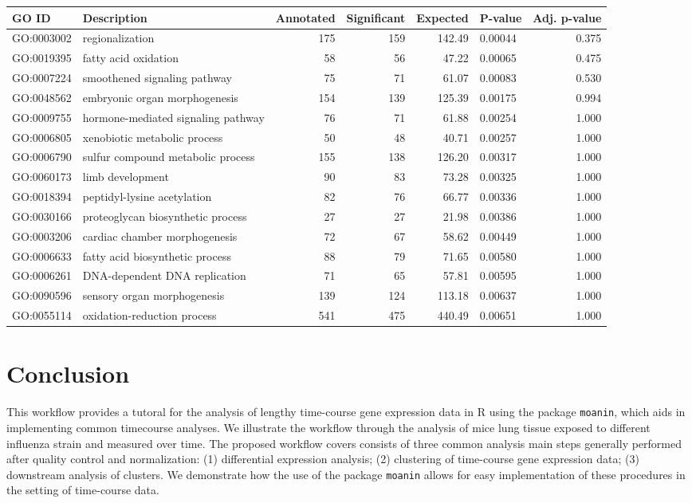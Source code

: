 \documentclass[9pt,a4paper,]{extarticle}
\begin{document}
\begin{tabular}{llrrrlr}
\toprule
GO ID & Description & Annotated & Significant & Expected & P-value & Adj. p-value\\
\midrule
GO:0003002 & regionalization & 175 & 159 & 142.49 & 0.00044 & 0.375\\
GO:0019395 & fatty acid oxidation & 58 & 56 & 47.22 & 0.00065 & 0.475\\
GO:0007224 & smoothened signaling pathway & 75 & 71 & 61.07 & 0.00083 & 0.530\\
GO:0048562 & embryonic organ morphogenesis & 154 & 139 & 125.39 & 0.00175 & 0.994\\
GO:0009755 & hormone-mediated signaling pathway & 76 & 71 & 61.88 & 0.00254 & 1.000\\
\addlinespace
GO:0006805 & xenobiotic metabolic process & 50 & 48 & 40.71 & 0.00257 & 1.000\\
GO:0006790 & sulfur compound metabolic process & 155 & 138 & 126.20 & 0.00317 & 1.000\\
GO:0060173 & limb development & 90 & 83 & 73.28 & 0.00325 & 1.000\\
GO:0018394 & peptidyl-lysine acetylation & 82 & 76 & 66.77 & 0.00336 & 1.000\\
GO:0030166 & proteoglycan biosynthetic process & 27 & 27 & 21.98 & 0.00386 & 1.000\\
\addlinespace
GO:0003206 & cardiac chamber morphogenesis & 72 & 67 & 58.62 & 0.00449 & 1.000\\
GO:0006633 & fatty acid biosynthetic process & 88 & 79 & 71.65 & 0.00580 & 1.000\\
GO:0006261 & DNA-dependent DNA replication & 71 & 65 & 57.81 & 0.00595 & 1.000\\
GO:0090596 & sensory organ morphogenesis & 139 & 124 & 113.18 & 0.00637 & 1.000\\
GO:0055114 & oxidation-reduction process & 541 & 475 & 440.49 & 0.00651 & 1.000\\
\bottomrule
\end{tabular}

\hypertarget{conclusion}{%
\section{Conclusion}\label{conclusion}}

This workflow provides a tutoral for the analysis of lengthy time-course gene
expression data in R using the package \texttt{moanin}, which aids in implementing common timecourse analyses. We illustrate the workflow through the analysis of mice lung tissue
exposed to different influenza strain and measured over time.
The proposed workflow covers consists of three common analysis main steps generally performed after quality
control and normalization: (1) differential expression analysis; (2)
clustering of time-course gene expression data; (3) downstream analysis of
clusters. We demonstrate how the use of the package \texttt{moanin} allows for easy implementation of these procedures in the setting of time-course data.
\end{document}
